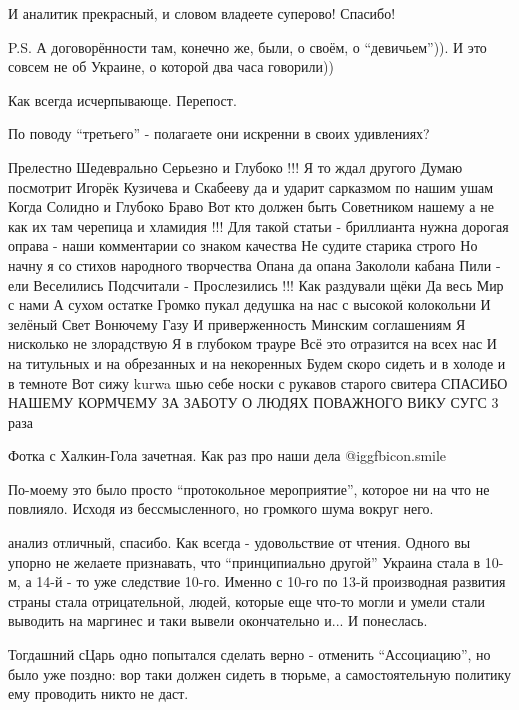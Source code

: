 \begin{itemize}
И аналитик прекрасный, и словом владеете суперово!
Спасибо!

P.S. А договорённости там, конечно же, были, о своём, о \enquote{девичьем})). И
это совсем не об Украине, о которой два часа говорили))

Как всегда исчерпывающе. Перепост.

По поводу \enquote{третьего} - полагаете они искренни в своих удивлениях?


Прелестно Шедеврально Серьезно и Глубоко !!! Я то ждал другого Думаю посмотрит
Игорёк Кузичева и Скабееву да и ударит сарказмом по нашим ушам Когда Солидно и
Глубоко Браво Вот кто должен быть Советником нашему а не как их там черепица и
хламидия !!! Для такой статьи - бриллианта нужна дорогая оправа - наши
комментарии со знаком качества Не судите старика строго Но начну я со стихов
народного творчества Опана да опана Закололи кабана Пили - ели Веселились
Подсчитали - Прослезились !!! Как раздували щёки Да весь Мир с нами А сухом
остатке Громко пукал дедушка на нас с высокой колокольни И зелёный Свет
Вонючему Газу И приверженность Минским соглашениям Я нисколько не злорадствую Я
в глубоком трауре Всё это отразится на всех нас И на титульных и на обрезанных
и на некоренных Будем скоро сидеть и в холоде и в темноте Вот сижу kurwa шью
себе носки с рукавов старого свитера СПАСИБО НАШЕМУ КОРМЧЕМУ ЗА ЗАБОТУ О ЛЮДЯХ
ПОВАЖНОГО ВИКУ СУГС 3 раза

Фотка с Халкин-Гола зачетная.
Как раз про наши дела  @igg{fbicon.smile} 


По-моему это было просто \enquote{протокольное мероприятие}, которое ни на что не
повлияло. Исходя из бессмысленного, но громкого шума вокруг него.


анализ отличный, спасибо. Как всегда - удовольствие от чтения. Одного вы упорно
не желаете признавать, что \enquote{принципиально другой} Украина стала в 10-м, а 14-й
- то уже следствие 10-го. Именно с 10-го по 13-й производная развития страны
стала отрицательной, людей, которые еще что-то могли и умели стали выводить на
маргинес и таки вывели окончательно и... И понеслась.

Тогдашний сЦарь одно попытался сделать верно - отменить \enquote{Ассоциацию}, но было
уже поздно: вор таки должен сидеть в тюрьме, а самостоятельную политику ему
проводить никто не даст.

\end{itemize} %
